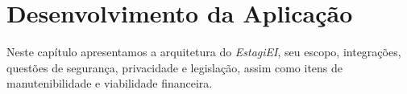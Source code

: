 \chapter{Desenvolvimento da Aplicação}
Neste capítulo apresentamos a arquitetura do \emph{EstagiEI}, seu escopo, integrações, questões de segurança, privacidade e legislação, assim como itens de manutenibilidade e viabilidade financeira.














%